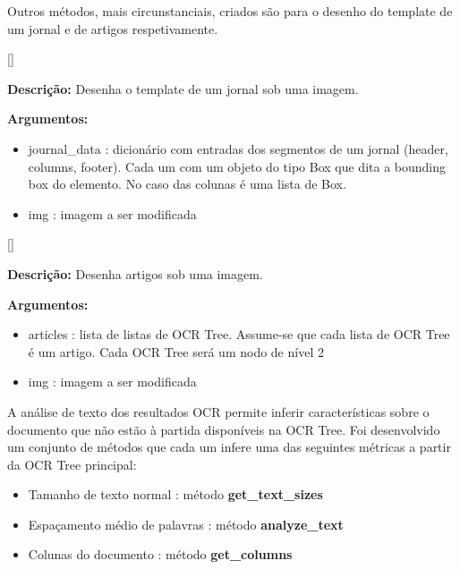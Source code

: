 
Outros métodos, mais circunstanciais, criados são para o desenho do template de um jornal e de artigos respetivamente.

[\normalsize]

\textbf{Descrição:} Desenha o template de um jornal sob uma imagem.

\textbf{Argumentos:}
\begin{itemize}\setlength\itemsep{-0.3em}
	\item journal\_data : dicionário com entradas dos segmentos de um jornal (header, columns, footer). Cada um com um objeto do tipo Box que dita a bounding box do elemento. No caso das colunas é uma lista de Box.
	\item img : imagem a ser modificada
\end{itemize}


[\normalsize]

\textbf{Descrição:} Desenha artigos sob uma imagem.

\textbf{Argumentos:}
\begin{itemize}\setlength\itemsep{-0.3em}
	\item articles : lista de listas de OCR Tree. Assume-se que cada lista de OCR Tree é um artigo. Cada OCR Tree será um nodo de nível 2
	\item img : imagem a ser modificada
\end{itemize}



\label{contribution_text_analyses}

A análise de texto dos resultados OCR permite inferir características sobre o documento que não estão à partida disponíveis na OCR Tree. Foi desenvolvido um conjunto de métodos que cada um infere uma das seguintes métricas a partir da OCR Tree principal:

\begin{itemize}
	\item Tamanho de texto normal : método \textbf{get\_text\_sizes}
	\item Espaçamento médio de palavras : método \textbf{analyze\_text}
	\item Colunas do documento : método \textbf{get\_columns}
\end{itemize}


